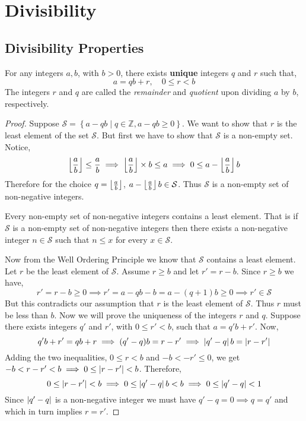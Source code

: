 \chapter{Divisibility}
\section{Divisibility Properties}

\begin{theorem}
    For any integers $a,b$, with $b>0$, there exists \textbf{unique} integers 
    $q$ and $r$ such that,
    \[
        a = qb + r, \quad 0 \leq r < b
    \]
    The integers $r$ and $q$ are called the \emph{remainder} and \emph{quotient} upon 
    dividing $a$ by $b$, respectively.
\end{theorem}
\begin{proof}
    Suppose $\mathcal{S} = \left\{ a-qb \mid q \in \mathbb{Z}, a-qb \geq 0 \right\}$. 
    We want to show that $r$ is the least element of the set $\mathcal{S}$. 
    But first we have to show that $\mathcal{S}$ is a non-empty set. Notice, 
    \[
    \left\lfloor \frac{a}{b} \right\rfloor \leq \frac{a}{b} 
    \implies \left\lfloor \frac{a}{b} \right\rfloor \times b \leq a 
    \implies 0 \leq a - \left\lfloor \frac{a}{b} \right\rfloor b
    \]
    Therefore for the choice $q = \left\lfloor \frac{a}{b} \right\rfloor$, $a - \left\lfloor \frac{a}{b} \right\rfloor b \in \mathcal{S}$. 
    Thus $\mathcal{S}$ is a non-empty set of non-negative integers.
    \begin{theorem*}
        Every non-empty set of non-negative integers contains a least element. 
        That is if $\mathcal{S}$ is a non-empty set of non-negative integers then 
        there exists a non-negative integer $n \in \mathcal{S}$ such that 
        $n \leq x$ for every $x \in \mathcal{S}$.
    \end{theorem*}
    Now from the Well Ordering Principle we know that $\mathcal{S}$ contains a least element. 
    Let $r$ be the least element of $\mathcal{S}$. Assume $r \geq b$ and let $r' = r - b$. 
    Since $r \geq b$ we have,
    \[
        r' = r - b \geq 0 
        \implies r' = a - qb - b = a - (q+1)b \geq 0 
        \implies r' \in \mathcal{S}
    \]
    But this contradicts our assumption that $r$ is the least element of $\mathcal{S}$. 
    Thus $r$ must be less than $b$. Now we will prove the uniqueness of the integers $r$ and $q$. 
    Suppose there exists integers $q'$ and $r'$, with $0\leq r' < b$, such that $a = q'b + r'$. Now, 
    \[
        q'b + r' = qb + r 
        \implies (q' - q)b = r - r' 
        \implies \left\lvert q' - q \right\rvert b = \left\lvert r - r' \right\rvert
    \]
    Adding the two inequalities, $0 \leq r < b$ and $-b < -r' \leq 0$, 
    we get $-b < r - r' < b \implies 0 \leq \left\lvert r-r' \right\rvert < b$. Therefore,
    \[
    0 \leq \left\lvert r-r' \right\rvert < b 
    \implies 0\leq \left\lvert q' - q \right\rvert b < b 
    \implies 0\leq \left\lvert q' - q \right\rvert < 1
    \]
    Since $\left\lvert q' - q \right\rvert$ is a non-negative integer we must have $q' - q=0 \implies q= q'$ 
    and which in turn implies $r=r'$.
\end{proof}
